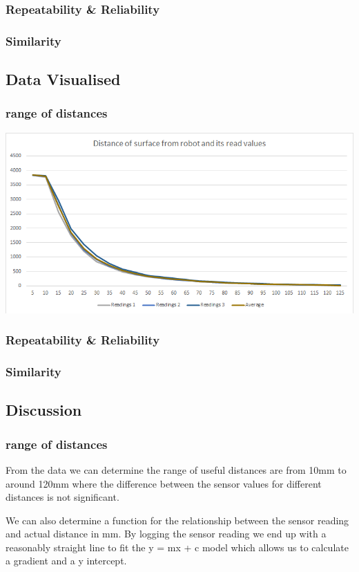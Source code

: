 \documentclass[11pt,a4paper,titlepage]{article}
\begin{document}
	\subsubsection{Repeatability \& Reliability}
	\subsubsection{Similarity}
\subsection{Data Visualised}
	\subsubsection{range of distances}
	\includegraphics[width=\textwidth,height=\textheight,keepaspectratio]{irRangeLineGraph}
	\subsubsection{Repeatability \& Reliability}
	\subsubsection{Similarity}
\subsection{Discussion}
	\subsubsection{range of distances}
		From the data we can determine the range of useful distances are from 10mm to around 120mm where the difference between the sensor values for different distances is not significant.
		
		We can also determine a function for the relationship between the sensor reading and actual distance in mm. By logging the sensor reading we end up with a reasonably straight line to fit the y = mx + c model which allows us to calculate a gradient and a y intercept.
		
\end{document}
